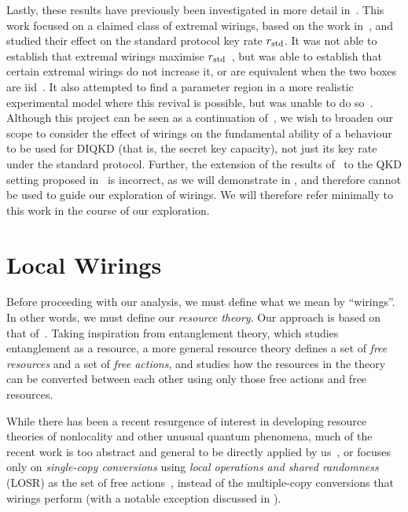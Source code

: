 \documentclass[10pt, a4paper]{article}
\numberwithin{equation}{section} %
\theoremstyle{definition}
\theoremstyle{plain}
\newcommand{\?}{\mathrel{?}} %
\newcommand{\std}{\rm std}
\begin{document}
              Lastly, these results have previously been investigated in more detail in~\cite{JanLiThesis}. This work focused on a claimed class of extremal wirings, based on the work in~\cite{ShortEntangleSwap}, and studied their effect on the standard protocol key rate \(r_{\std}\). It was not able to establish that extremal wirings maximise \(r_{\std}\)~\cite[Sec. 7.2]{JanLiThesis}, but was able to establish that certain extremal wirings do not increase it, or are equivalent when the two boxes are iid~\cite[Sec. 7.3]{JanLiThesis}. It also attempted to find a parameter region in a more realistic experimental model where this revival is possible, but was unable to do so~\cite[Sec. 9]{JanLiThesis}. Although this project can be seen as a continuation of~\cite{JanLiThesis}, we wish to broaden our scope to consider the effect of wirings on the fundamental ability of a behaviour to be used for DIQKD (that is, the secret key capacity), not just its key rate under the standard protocol. Further, the extension of the results of~\cite{ShortEntangleSwap} to the QKD setting proposed in~\cite{JanLiThesis} is incorrect, as we will demonstrate in , and therefore cannot be used to guide our exploration of wirings. We will therefore refer minimally to this work in the course of our exploration.

              \section{Local Wirings}\label{sec:locwir}

              Before proceeding with our analysis, we must define what we mean by ``wirings''. In other words, we must define our \emph{resource theory}. Our approach is based on that of~\cite{NonclassicalCausation}. Taking inspiration from entanglement theory, which studies entanglement as a resource, a more general resource theory defines a set of \emph{free resources} and a set of \emph{free actions}, and studies how the resources in the theory can be converted between each other using only those free actions and free resources.

              While there has been a recent resurgence of interest in developing resource theories of nonlocality and other unusual quantum phenomena, much of the recent work is too abstract and general to be directly applied by us~\cite{Monotones, TypeIndepLOSR}, or focuses only on \emph{single-copy conversions} using \emph{local operations and shared randomness} (LOSR) as the set of free actions~\cite{NonclassicalCausation, TraceDistNL, NLMeas}, instead of the multiple-copy conversions that wirings perform (with a notable exception discussed in ).
\end{document}
